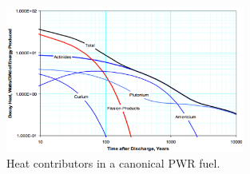 \begin{figure}[htbp!]
  \begin{center}
    \includegraphics[width=0.7\textwidth]{./images/wigeland_heat.eps}
  \end{center}
  \caption{Heat contributors in a canonical PWR 
    fuel\cite{wigeland_relationship_2010}.}
  \label{fig:<++>}
\end{figure}
